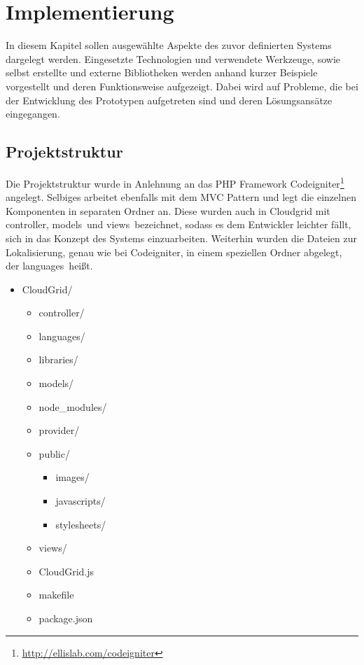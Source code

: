 \chapter{Implementierung}
In diesem Kapitel sollen ausgewählte Aspekte des zuvor definierten Systems dargelegt werden.
Eingesetzte Technologien und verwendete Werkzeuge, sowie selbst erstellte und externe Bibliotheken werden anhand kurzer Beispiele vorgestellt und deren Funktionsweise aufgezeigt.
Dabei wird auf Probleme, die bei der Entwicklung des Prototypen aufgetreten sind und deren Lösungsansätze eingegangen.

\section{Projektstruktur}
Die Projektstruktur wurde in Anlehnung an das PHP Framework Codeigniter\footnote{\url{http://ellislab.com/codeigniter}} angelegt.
Selbiges arbeitet ebenfalls mit dem \ac{MVC} Pattern und legt die einzelnen Komponenten in separaten Ordner an.
Diese wurden auch in Cloudgrid mit \frqq controller\flqq , \frqq models\flqq\ und \frqq views\flqq\ bezeichnet, sodass es dem Entwickler leichter fällt, sich in das Konzept des Systems einzuarbeiten.
Weiterhin wurden die Dateien zur Lokalisierung, genau wie bei Codeigniter, in einem speziellen Ordner abgelegt, der \frqq languages\flqq\ heißt.

\begin{itemize}
    \item CloudGrid/
    \begin{itemize}
        \item controller/
        \item languages/
        \item libraries/
        \item models/
        \item node\_modules/
        \item provider/
        \item public/
        \begin{itemize}
            \item images/
            \item javascripts/
            \item stylesheets/
        \end{itemize}
        \item views/
        \item CloudGrid.js
        \item makefile
        \item package.json
    \end{itemize}
\end{itemize}

